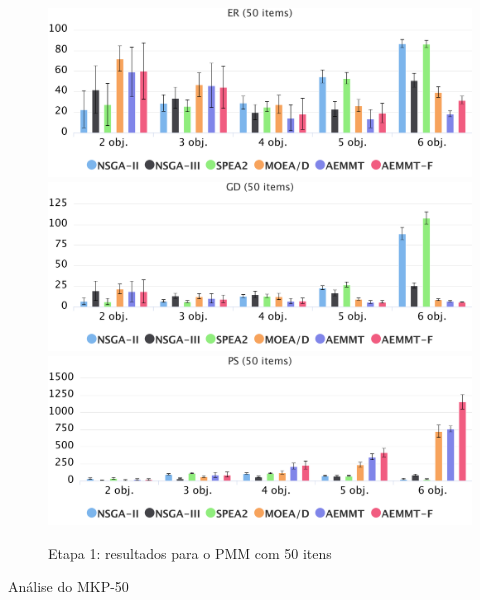 \begin{figure}[!htbp]
	\caption{Etapa 1: resultados para o PMM com 50 itens}
	\label{fig_exp1_mkp_50}
	\includegraphics[width=1\textwidth]{cap_experimentos/figs/etapa1/er-mkp-50}
	\includegraphics[width=1\textwidth]{cap_experimentos/figs/etapa1/gd-mkp-50}
	\includegraphics[width=1\textwidth]{cap_experimentos/figs/etapa1/ps-mkp-50}
\end{figure}

Análise do MKP-50

